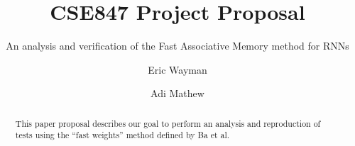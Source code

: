 \documentclass[siggraph, review=false]{acmart}
\begin{document}
\title{CSE847 Project Proposal}
\subtitle{An analysis and verification of the Fast Associative Memory method for RNNs}

\author{Eric Wayman}

\author{Adi Mathew}

\begin{abstract}
This paper proposal describes our goal to perform an analysis and reproduction of tests using the ``fast weights'' method defined by Ba et al.
\end{abstract}


\maketitle

% 





\end{document}
